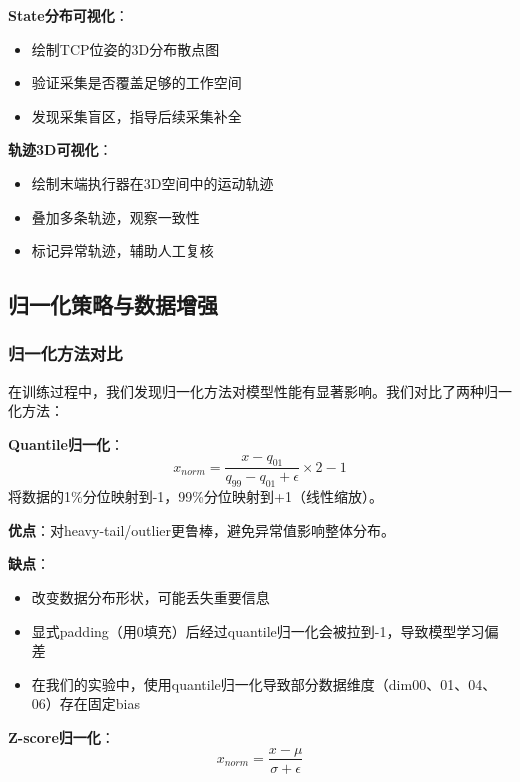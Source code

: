 \textbf{State分布可视化}：
\begin{itemize}[leftmargin=2em]
    \item 绘制TCP位姿的3D分布散点图
    \item 验证采集是否覆盖足够的工作空间
    \item 发现采集盲区，指导后续采集补全
\end{itemize}

\textbf{轨迹3D可视化}：
\begin{itemize}[leftmargin=2em]
    \item 绘制末端执行器在3D空间中的运动轨迹
    \item 叠加多条轨迹，观察一致性
    \item 标记异常轨迹，辅助人工复核
\end{itemize}

\subsection{归一化策略与数据增强}

\subsubsection{归一化方法对比}

在训练过程中，我们发现归一化方法对模型性能有显著影响。我们对比了两种归一化方法：

\textbf{Quantile归一化}：
\begin{equation}
x_{norm} = \frac{x - q_{01}}{q_{99} - q_{01} + \epsilon} \times 2 - 1
\end{equation}
将数据的1\%分位映射到-1，99\%分位映射到+1（线性缩放）。

\textbf{优点}：对heavy-tail/outlier更鲁棒，避免异常值影响整体分布。

\textbf{缺点}：
\begin{itemize}[leftmargin=2em]
    \item 改变数据分布形状，可能丢失重要信息
    \item 显式padding（用0填充）后经过quantile归一化会被拉到-1，导致模型学习偏差
    \item 在我们的实验中，使用quantile归一化导致部分数据维度（dim00、01、04、06）存在固定bias
\end{itemize}

\textbf{Z-score归一化}：
\begin{equation}
x_{norm} = \frac{x - \mu}{\sigma + \epsilon}
\end{equation}

